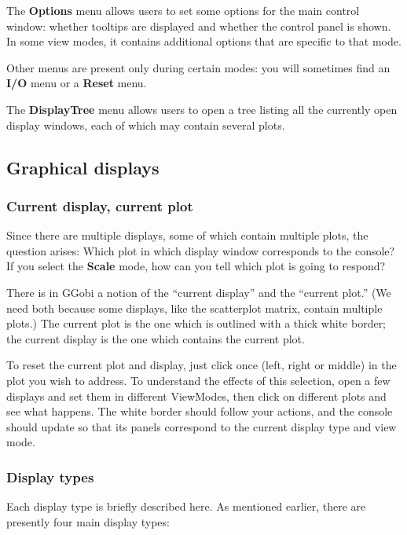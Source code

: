 \documentclass[11pt]{article}
\begin{document}
The {\bf Options} menu allows users to set some options for the main
control window:  whether tooltips are displayed and whether the
control panel is shown.  In some view modes, it contains additional
options that are specific to that mode.

Other menus are present only during certain modes:  you will
sometimes find an {\bf I/O} menu or a {\bf Reset} menu.

The {\bf DisplayTree} menu allows users to open a tree listing
all the currently open display windows, each of which may contain
several plots.

\subsection{Graphical displays}
\label{slbl:GraphicalDisplays}

\subsubsection{Current display, current plot}

Since there are multiple displays, some of which contain multiple
plots, the question arises:  Which plot in which display window
corresponds to the console?  If you select the {\bf Scale} mode,
how can you tell which plot is going to respond?

There is in GGobi a notion of the ``current display'' and the
``current plot.''  (We need both because some displays, like the
scatterplot matrix, contain multiple plots.) The current plot is the
one which is outlined with a thick white border; the current display
is the one which contains the current plot.

To reset the current plot and display, just click once (left, right
or middle) in the plot you wish to address.  To understand the
effects of this selection, open a few displays and set them in
different ViewModes, then click on different plots and see what
happens.  The white border should follow your actions, and the
console should update so that its panels correspond to the
current display type and view mode.

\subsubsection{Display types}
\label{DisplayTypes}

Each display type is briefly described here. 
As mentioned earlier, there are presently four main display types:
\end{document}
